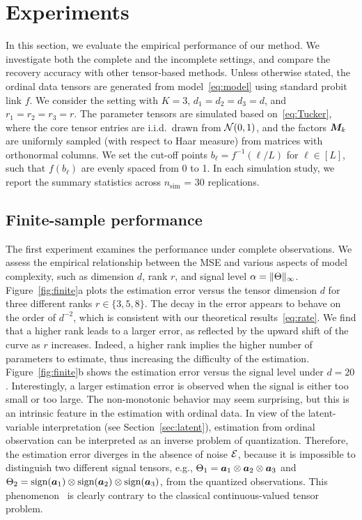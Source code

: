 \documentclass{article}
\theoremstyle{plain}
\theoremstyle{definition}
\begin{document}
\section{Experiments}\label{sec:experiment}
In this section, we evaluate the empirical performance of our method. We investigate both the complete and the incomplete settings, and compare the recovery accuracy with other tensor-based methods. Unless otherwise stated, the ordinal data tensors are generated from model~\eqref{eq:model} using standard probit link $f$. We consider the setting with $K=3$, $d_1=d_2=d_3=d$, and $r_1=r_2=r_3=r$. The parameter tensors are simulated based on~\eqref{eq:Tucker}, where the core tensor entries are i.i.d.\ drawn from $\mathcal{N}(0,1)$, and the factors $\bm M_k$ are uniformly sampled (with respect to Haar measure) from matrices with orthonormal columns. We set the cut-off points $b_\ell=f^{-1}(\ell/L)$ for $\ell\in[L]$, such that $f(b_\ell)$ are evenly spaced from 0 to 1. In each simulation study, we report the summary statistics across $n_{\text{sim}}$ = 30 replications.


\subsection{Finite-sample performance}\label{sec:simulation}
The first experiment examines the performance under complete observations. We assess the empirical relationship between the MSE and various aspects of model complexity, such as dimension $d$, rank $r$, and signal level $\alpha=\lVert\Theta\rVert_\infty$. Figure~\ref{fig:finite}a plots the estimation error versus the tensor dimension $d$ for three different ranks $r\in\{3,5,8\}$. The decay in the error appears to behave on the order of $d^{-2}$, which is consistent with our theoretical results~\eqref{eq:rate}. We find that a higher rank leads to a larger error, as reflected by the upward shift of the curve as $r$ increases. Indeed, a higher rank implies the higher number of parameters to estimate, thus increasing the difficulty of the estimation. Figure~\ref{fig:finite}b shows the estimation error versus the signal level under $d=20$. Interestingly, a larger estimation error is observed when the signal is either too small or too large. The non-monotonic behavior may seem surprising, but this is an intrinsic feature in the estimation with ordinal data. In view of the latent-variable interpretation (see Section~\ref{sec:latent}), estimation from ordinal observation can be interpreted as an inverse problem of quantization. Therefore, the estimation error diverges in the absence of noise $\mathcal{E}$, because it is impossible to distinguish two different signal tensors, e.g., $\Theta_1=\bm{a}_1\otimes \bm{a}_2\otimes \bm{a}_3$ and $\Theta_2=\text{sign}(\bm{a}_1)\otimes \text{sign}(\bm{a}_2)\otimes \text{sign}(\bm{a}_3)$, from the quantized observations. This phenomenon~\cite{davenport2014,sur2019modern} is clearly contrary to the classical continuous-valued tensor problem.
\end{document}
